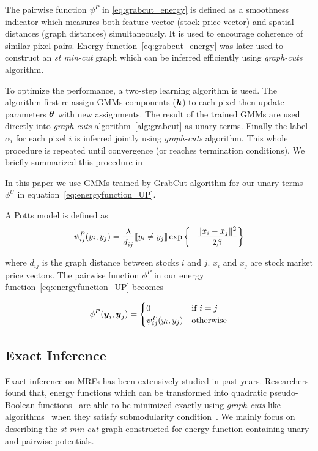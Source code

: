 The pairwise function $\psi^P$ in \eqref{eq:grabcut_energy} is
defined as a smoothness indicator which measures both feature
vector (stock price vector) and spatial distances (graph
distances) simultaneously. It is used to encourage coherence of
similar pixel pairs. Energy function~\eqref{eq:grabcut_energy}
was later used to construct an \emph{st min-cut} graph which can
be inferred efficiently using
\emph{graph-cuts}~\cite{Boykov:ICCV01} algorithm.

To optimize the performance, a two-step learning algorithm is
used. The algorithm first re-assign GMMs components (${\boldsymbol{k}}$) to
each pixel then update parameters $\boldsymbol{\theta}$ with new assignments.
The result of the trained GMMs are used directly into
\emph{graph-cuts} algorithm~\ref{alg:grabcut} as unary terms.
Finally the label $\alpha_i$ for each pixel $i$ is inferred
jointly using \emph{graph-cuts} algorithm. This whole procedure
is repeated until convergence (or reaches termination
conditions). We briefly summarized this procedure in

In this paper we use GMMs trained by GrabCut algorithm for our
unary terms $\phi^U$ in equation~\eqref{eq:energyfunction_UP}.

A Potts model is defined as
\begin{align}
  \label{eq:potts}
  \psi^P_{ij}(y_i, y_j) = \frac{\lambda}{d_{ij}} \ind{y_i \neq
      y_j} \exp\left\{- \frac{\|x_i - x_j\|^2}{2 \beta}\right\}
\end{align}

\noindent where $d_{ij}$ is the graph distance between stocks $i$
and $j$. $x_i$ and $x_j$ are stock market price vectors. The
pairwise function $\phi^P$ in our energy
function~\eqref{eq:energyfunction_UP} becomes

\begin{align}
  \label{eq:energyfunction_pairwise}
  \phi^P(\by_i,\by_j)=
  \begin{cases}
    0 & \text{if } i = j \\
    \psi^P_{ij}(y_i, y_j) &
    \text{otherwise}
  \end{cases}
\end{align}


\subsection{Exact Inference}
\label{sec:exact_inference}

Exact inference on MRFs has been extensively studied in past
years. Researchers found that, energy functions which can be
transformed into quadratic pseudo-Boolean
functions~\cite{Ishikawa:PAMI03,Ishikawa:CVPR09,Rother:CVPR09}
are able to be minimized exactly using \emph{graph-cuts} like
algorithms~\cite{Freedman:CVPR05,Hammer:1965} when they satisfy
submodularity condition~\cite{Boros:MATH02}. We mainly focus on
describing the \emph{st-min-cut} graph constructed for energy
function containing unary and pairwise potentials.

